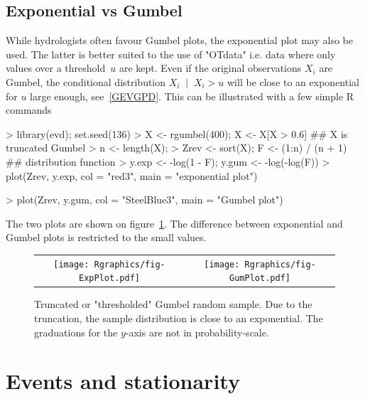 \documentclass[a4paper]{report}
\newcommand{\Cond}[2]{\left. #1 \;\middle\vert\; #2 \right.}
\begin{document}
\subsection{Exponential vs Gumbel}

While hydrologists often favour Gumbel plots, the exponential plot may
also be used. The latter is better suited to the use of "OTdata"
i.e. data where only values over a threshold~$u$ are kept. Even if
the original observations $X_i$ are Gumbel, the conditional
distribution $\Cond{X_i}{X_i>u}$ will be close to an exponential for
$u$ large enough, see~\ref{GEVGPD}. This can be illustrated with a
few simple R commands \label{GUMBEXP}

\begin{Schunk}
\begin{Sinput}
> library(evd); set.seed(136)
> X <- rgumbel(400); X <- X[X > 0.6]           ## X is truncated Gumbel
> n <- length(X); 
> Zrev <- sort(X); F <- (1:n) / (n + 1)           ## distribution function
> y.exp <- -log(1 - F); y.gum <- -log(-log(F))   
> plot(Zrev, y.exp, col = "red3", main = "exponential plot")
\end{Sinput}
\end{Schunk}
\vspace{-13pt}
\begin{Schunk}
\begin{Sinput}
> plot(Zrev, y.gum, col = "SteelBlue3", main = "Gumbel plot")
\end{Sinput}
\end{Schunk}

\noindent
The two plots are shown on figure~\ref{EXPGUM}. The difference
between exponential and Gumbel plots is restricted to the small values.

\begin{figure}
   \centering
   \begin{tabular}{c c} 
     \texttt{[image: Rgraphics/fig-ExpPlot.pdf]} &
     \texttt{[image: Rgraphics/fig-GumPlot.pdf]} 
   \end{tabular}
   \caption{\label{EXPGUM} Truncated or "thresholded" Gumbel random
     sample.  Due to the truncation, the sample distribution is close
     to an exponential.  The graduations for the $y$-axis are not in
     probability-scale.}
\end{figure}

\section{Events and stationarity}
\end{document}
